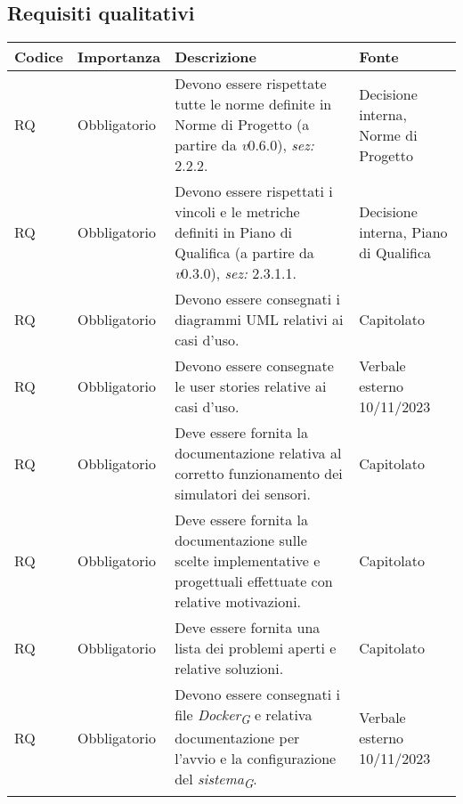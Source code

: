 \subsection{Requisiti qualitativi}
\setcounter{rowcounter}{0}
\begin{longtable}{|C{1.5cm}|C{2cm}|L{5cm}|C{2cm}|}
    \hline
    \textbf{Codice} & \textbf{Importanza} & \textbf{Descrizione} & \textbf{Fonte} \\

    \hline
     RQ & Obbligatorio & Devono essere rispettate tutte le norme definite in Norme di Progetto (a partire da \textit{v}0.6.0), \textit{sez:} 2.2.2. & Decisione interna, Norme di Progetto \\

    \hline
     RQ & Obbligatorio & Devono essere rispettati i vincoli e le metriche definiti in Piano di Qualifica (a partire da \textit{v}0.3.0), \textit{sez:} 2.3.1.1. & Decisione interna, Piano di Qualifica \\

    \hline
     RQ & Obbligatorio & Devono essere consegnati i diagrammi UML relativi ai casi d'uso. & Capitolato\\

    \hline
     RQ & Obbligatorio & Devono essere consegnate le user stories relative ai casi d'uso. & Verbale esterno 10/11/2023\\

    \hline
     RQ & Obbligatorio & Deve essere fornita la documentazione relativa al corretto funzionamento dei simulatori dei sensori. & Capitolato\\

    \hline
     RQ & Obbligatorio & Deve essere fornita la documentazione sulle scelte implementative e progettuali effettuate con relative motivazioni. & Capitolato \\

    \hline
     RQ & Obbligatorio & Deve essere fornita una lista dei problemi aperti e relative soluzioni. & Capitolato \\

    \hline
     RQ & Obbligatorio & Devono essere consegnati i file \textit{Docker}\textsubscript{\textit{G}} e relativa documentazione per l'avvio e la configurazione del \textit{sistema}\textsubscript{\textit{G}}. & Verbale esterno 10/11/2023 \\


\end{longtable}
